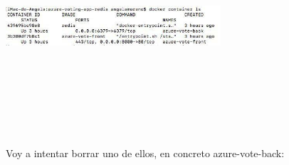 \documentclass[english,runningheads,a4paper]{llncs}[2018/03/10]
\newenvironment{nscenter}
 {\parskip=0pt\par\nopagebreak\centering}
 {\par\noindent\ignorespacesafterend}
\begin{document}
\begin{nscenter}
\includegraphics[width=8cm,height=8cm,keepaspectratio]{./Contenedores/Azure/14.png}
\end{nscenter}
\newline
Voy a intentar borrar uno de ellos, en concreto azure-vote-back:
\end{document}
